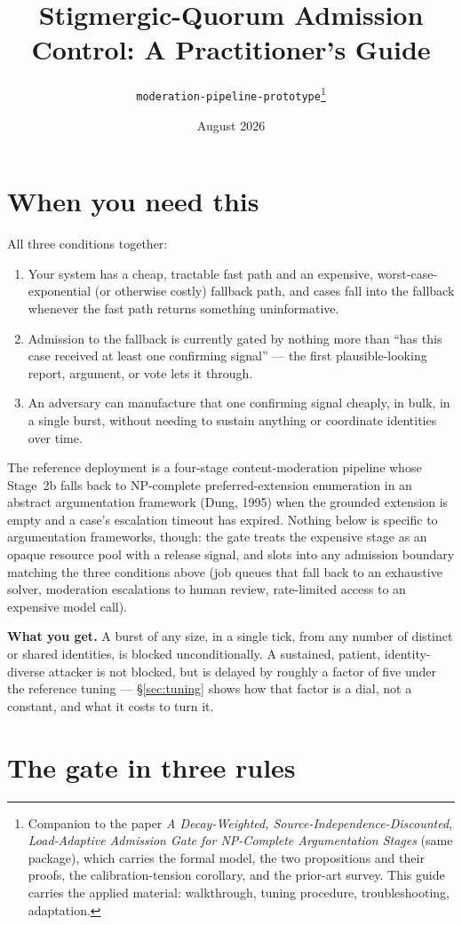 \documentclass[11pt]{article}
\title{Stigmergic-Quorum Admission Control: A Practitioner's Guide}
\author{\texttt{moderation-pipeline-prototype}\thanks{Companion to the
    paper \emph{A Decay-Weighted, Source-Independence-Discounted,
    Load-Adaptive Admission Gate for NP-Complete Argumentation Stages}
    (same package), which carries the formal model, the two
    propositions and their proofs, the calibration-tension corollary,
    and the prior-art survey. This guide carries the applied material:
    walkthrough, tuning procedure, troubleshooting, adaptation.}}
\date{August 2026}
\begin{document}
\maketitle

\section{When you need this}
\label{sec:when}

All three conditions together:

\begin{enumerate}
\item Your system has a cheap, tractable fast path and an expensive,
  worst-case-exponential (or otherwise costly) fallback path, and cases
  fall into the fallback whenever the fast path returns something
  uninformative.
\item Admission to the fallback is currently gated by nothing more than
  ``has this case received at least one confirming signal'' --- the
  first plausible-looking report, argument, or vote lets it through.
\item An adversary can manufacture that one confirming signal cheaply,
  in bulk, in a single burst, without needing to sustain anything or
  coordinate identities over time.
\end{enumerate}

The reference deployment is a four-stage content-moderation pipeline
whose Stage~2b falls back to NP-complete preferred-extension enumeration
in an abstract argumentation framework (Dung, 1995) when the grounded
extension is empty and a case's escalation timeout has expired. Nothing
below is specific to argumentation frameworks, though: the gate treats
the expensive stage as an opaque resource pool with a release signal,
and slots into any admission boundary matching the three conditions
above (job queues that fall back to an exhaustive solver, moderation
escalations to human review, rate-limited access to an expensive model
call).

\medskip
\noindent
\textbf{What you get.} A burst of any size, in a single tick, from any
number of distinct or shared identities, is blocked unconditionally.
A sustained, patient, identity-diverse attacker is not blocked, but is
delayed by roughly a factor of five under the reference tuning ---
\S\ref{sec:tuning} shows how that factor is a dial, not a constant, and
what it costs to turn it.

\section{The gate in three rules}
\label{sec:rules}
\end{document}
